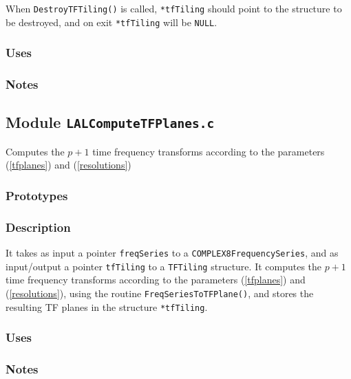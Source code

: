 When \verb+DestroyTFTiling()+ is called, \verb+*tfTiling+ should point to the
structure to be destroyed, and on exit \verb+*tfTiling+ will be \verb+NULL+.

\subsubsection*{Uses}

\subsubsection*{Notes}

\vfill{\footnotesize}

\newpage
\subsection{Module \texttt{LALComputeTFPlanes.c}}
\label{ss:LALComputeTFPlanes.c}

Computes the $p+1$ time frequency transforms according to the parameters
(\ref{tfplanes}) and (\ref{resolutions})

\subsubsection*{Prototypes}
\vspace{0.1in}


\subsubsection*{Description}

It takes as input a pointer \verb+freqSeries+ to a
\verb+COMPLEX8FrequencySeries+, and as input/output a pointer \verb+tfTiling+
to a \verb+TFTiling+ structure.  It computes the $p+1$ time frequency
transforms according to the parameters (\ref{tfplanes}) and
(\ref{resolutions}), using the routine \verb+FreqSeriesToTFPlane()+, and
stores the resulting TF planes in the structure \verb+*tfTiling+.

\subsubsection*{Uses}

\subsubsection*{Notes}

